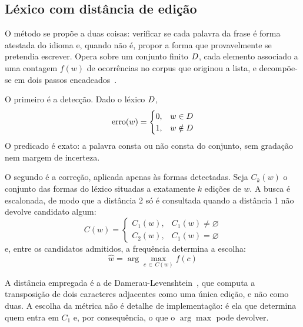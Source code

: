 \subsection{Léxico com distância de edição}
\label{met:lexico}

\indent\indent O método se propõe a duas coisas: verificar se cada palavra da frase é forma atestada do
idioma e, quando não é, propor a forma que provavelmente se pretendia escrever. Opera sobre um
conjunto finito $D$, cada elemento associado a uma contagem $f(w)$ de ocorrências no
corpus que originou a lista, e decompõe-se em dois passos encadeados~\cite{kukich1992}.

O primeiro é a detecção. Dado o léxico $D$,
%
\begin{equation}
\mathrm{erro}(w) = \begin{cases} 0, & w \in D \\ 1, & w \notin D \end{cases}
\label{eq:lex-deteccao}
\end{equation}
%
O predicado é exato: a palavra consta ou não consta do conjunto, sem gradação nem margem de
incerteza.

O segundo é a correção, aplicada apenas às formas detectadas. Seja $C_k(w)$ o conjunto das
formas do léxico situadas a exatamente $k$ edições de $w$. A busca é escalonada, de modo que a
distância 2 só é consultada quando a distância 1 não devolve candidato algum:
%
\begin{equation}
C(w) = \begin{cases} C_1(w), & C_1(w) \neq \varnothing \\[3pt] C_2(w), & C_1(w) = \varnothing \end{cases}
\label{eq:lex-escalonamento}
\end{equation}
%
e, entre os candidatos admitidos, a frequência determina a escolha:
%
\begin{equation}
\hat{w} = \arg\max_{c \,\in\, C(w)} f(c)
\label{eq:lex-argmax}
\end{equation}

A distância empregada é a de Damerau-Levenshtein~\cite{damerau1964,levenshtein1966}, que
computa a transposição de dois caracteres adjacentes como uma única edição, e não como duas. A
escolha da métrica não é detalhe de implementação: é ela que determina quem entra em $C_1$ e,
por consequência, o que o $\arg\max$ pode devolver.
